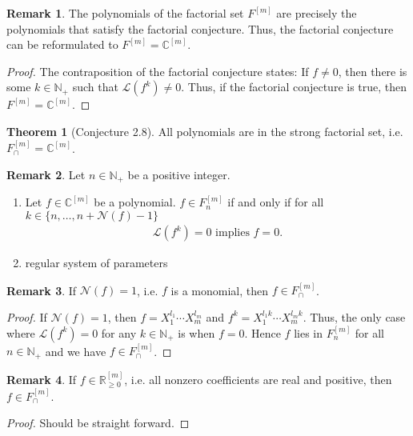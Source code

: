 \documentclass[a4paper]{article}
\theoremstyle{definition}
\newtheorem{theorem}[definition]{Theorem}
\newtheorem*{remark}{Remark}
\begin{document}
%
\begin{remark}
    The polynomials of the factorial set \(F^{[m]}\) are precisely the polynomials that satisfy the factorial conjecture. Thus, the factorial conjecture can be reformulated to \(F^{[m]} = \mathbb{C}^{[m]}\).
\end{remark}
%
\begin{proof}
    The contraposition of the factorial conjecture states: If \(f \neq 0\), then there is some \(k \in \mathbb{N}_+\) such that \(\mathcal{L}(f^k) \neq 0\). Thus, if the factorial conjecture is true, then \(F^{[m]} = \mathbb{C}^{[m]}\).
\end{proof}
%
\begin{theorem}[Conjecture 2.8]
    All polynomials are in the strong factorial set, i.e. \(F_\cap^{[m]} = \mathbb{C}^{[m]}\).
\end{theorem}
%
\begin{remark}
    Let \(n \in \mathbb{N}_+\) be a positive integer.
    \begin{enumerate}
        \item Let \(f \in \mathbb{C}^{[m]}\) be a polynomial. \(f \in F_n^{[m]}\) if and only if for all \(k \in \{n, \ldots, n + \mathcal{N}(f) - 1\}\)
        \begin{align*}
            \mathcal{L}(f^k) = 0 \text{ implies } f = 0 \text{.}
        \end{align*}
        \item regular system of parameters
    \end{enumerate}
\end{remark}
%
\begin{remark}
    If \(\mathcal{N}(f) = 1\), i.e. \(f\) is a monomial, then \(f \in F_\cap^{[m]}\).
\end{remark}
\begin{proof}
    If \(\mathcal{N}(f) = 1\), then \(f = X_1^{l_1} \cdots X_m^{l_m}\) and \(f^k = X_1^{l_1 k} \cdots X_m^{l_m k}\). Thus, the only case where \(\mathcal{L}(f^k) = 0\) for any \(k \in \mathbb{N}_+\) is when \(f = 0\). Hence \(f\) lies in \(F_n^{[m]}\) for all \(n \in \mathbb{N}_+\) and we have \(f \in F_\cap^{[m]}\).
\end{proof}
\begin{remark}
    If \(f \in \mathbb{R}^{[m]}_{\geq 0}\), i.e. all nonzero coefficients are real and positive, then \(f \in F_\cap^{[m]}\).
\end{remark}
\begin{proof}
    Should be straight forward.
\end{proof}
\end{document}
